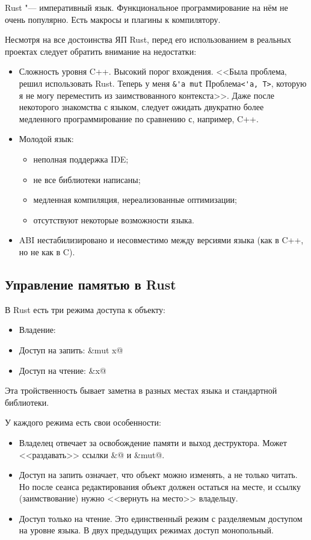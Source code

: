 \documentclass[10pt, a5paper]{article}
\begin{document}
Rust "--- императивный язык. Функциональное программирование на нём не очень популярно. Есть макросы и плагины к компилятору.

Несмотря на все достоинства ЯП Rust, перед его использованием в реальных проектах следует обратить внимание на недостатки:

\begin{itemize}
  \item Сложность уровня C++. Высокий порог вхождения. <<Была проблема, решил использовать Rust. Теперь у меня   
        \verb!&'a mut! Проблема\verb!<'a, T>!, которую я не могу переместить из заимствованного контекста>>.
Даже после некоторого знакомства с языком, следует ожидать двукратно более медленного программирование по сравнению с, например, C++.
  \item Молодой язык:
  \begin{itemize}
	  \item неполная поддержка IDE;
	  \item не все библиотеки написаны;
	  \item медленная компиляция, нереализованные оптимизации;
	  \item отсутствуют некоторые возможности языка.
  \end{itemize}
  \item ABI нестабилизировано и несовместимо между версиями языка (как в C++, но не как в C).
\end{itemize}

\subsection*{Управление памятью в Rust}

В Rust есть три режима доступа к объекту:

\begin{itemize}
  \item Владение: \verb@x@
  \item Доступ на запить: \verb@&mut x@
  \item Доступ на чтение: \verb@&x@
\end{itemize}

Эта тройственность бывает заметна в разных местах языка и стандартной библиотеки.

У каждого режима есть свои особенности:

\begin{itemize}
  \item Владелец отвечает за освобождение памяти и выход деструктора. Может <<раздавать>> ссылки \verb@\&@ и \verb@\&mut@.
  \item Доступ на запить означает, что объект можно изменять, а не только читать. Но после сеанса редактирования объект должен остаться на месте, и ссылку (заимствование) нужно <<вернуть на место>> владельцу.
  \item Доступ только на чтение. Это единственный режим с разделяемым доступом на уровне языка. В двух предыдущих режимах доступ монопольный.
\end{itemize}
\end{document}
